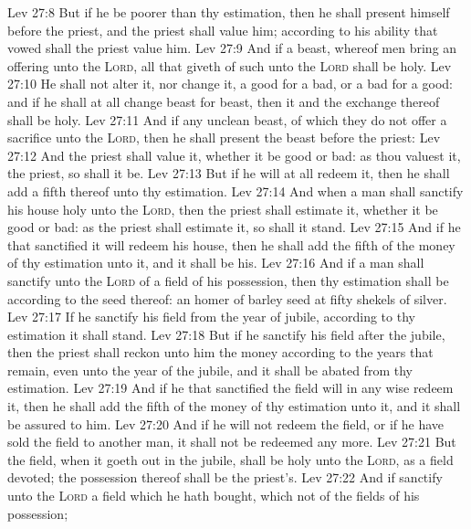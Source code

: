 \vs Lev 27:8 But if he be poorer than thy estimation, then he shall present himself before the priest, and the priest shall value him; according to his ability that vowed shall the priest value him.
\vs Lev 27:9 And if  a beast, whereof men bring an offering unto the \textsc{Lord}, all that  giveth of such unto the \textsc{Lord} shall be holy.
\vs Lev 27:10 He shall not alter it, nor change it, a good for a bad, or a bad for a good: and if he shall at all change beast for beast, then it and the exchange thereof shall be holy.
\vs Lev 27:11 And if  any unclean beast, of which they do not offer a sacrifice unto the \textsc{Lord}, then he shall present the beast before the priest:
\vs Lev 27:12 And the priest shall value it, whether it be good or bad: as thou valuest it,  the priest, so shall it be.
\vs Lev 27:13 But if he will at all redeem it, then he shall add a fifth  thereof unto thy estimation.
\vs Lev 27:14 And when a man shall sanctify his house  holy unto the \textsc{Lord}, then the priest shall estimate it, whether it be good or bad: as the priest shall estimate it, so shall it stand.
\vs Lev 27:15 And if he that sanctified it will redeem his house, then he shall add the fifth  of the money of thy estimation unto it, and it shall be his.
\vs Lev 27:16 And if a man shall sanctify unto the \textsc{Lord}  of a field of his possession, then thy estimation shall be according to the seed thereof: an homer of barley seed  at fifty shekels of silver.
\vs Lev 27:17 If he sanctify his field from the year of jubile, according to thy estimation it shall stand.
\vs Lev 27:18 But if he sanctify his field after the jubile, then the priest shall reckon unto him the money according to the years that remain, even unto the year of the jubile, and it shall be abated from thy estimation.
\vs Lev 27:19 And if he that sanctified the field will in any wise redeem it, then he shall add the fifth  of the money of thy estimation unto it, and it shall be assured to him.
\vs Lev 27:20 And if he will not redeem the field, or if he have sold the field to another man, it shall not be redeemed any more.
\vs Lev 27:21 But the field, when it goeth out in the jubile, shall be holy unto the \textsc{Lord}, as a field devoted; the possession thereof shall be the priest's.
\vs Lev 27:22 And if  sanctify unto the \textsc{Lord} a field which he hath bought, which  not of the fields of his possession;
